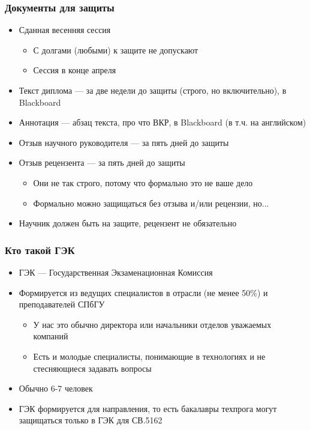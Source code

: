 \documentclass[xetex,mathserif,serif]{beamer}
\begin{document}
    \begin{frame}
        \frametitle{Документы для защиты}
        \begin{itemize}
            \item Сданная весенняя сессия
            \begin{itemize}
                \item С долгами (любыми) к защите не допускают
                \item Сессия в конце апреля
            \end{itemize}
            \item Текст диплома --- за две недели до защиты (строго, но включительно), в Blackboard
            \item Аннотация --- абзац текста, про что ВКР, в Blackboard (в т.ч. на английском)
            \item Отзыв научного руководителя --- за пять дней до защиты
            \item Отзыв рецензента --- за пять дней до защиты
            \begin{itemize}
                \item Они не так строго, потому что формально это не ваше дело
                \item Формально можно защищаться без отзыва и/или рецензии, но...
            \end{itemize}
            \item Научник должен быть на защите, рецензент не обязательно
        \end{itemize}
    \end{frame}

    \begin{frame}
        \frametitle{Кто такой ГЭК}
        \begin{itemize}
            \item ГЭК --- Государственная Экзаменационная Комиссия
            \item Формируется из ведущих специалистов в отрасли (не менее 50\%) и преподавателей СПбГУ
            \begin{itemize}
                \item У нас это обычно директора или начальники отделов уважаемых компаний
                \item Есть и молодые специалисты, понимающие в технологиях и не стесняющиеся задавать вопросы
            \end{itemize}
            \item Обычно 6-7 человек
            \item ГЭК формируется для направления, то есть бакалавры техпрога могут защищаться только в ГЭК для СВ.5162
        \end{itemize}
    \end{frame}
\end{document}
